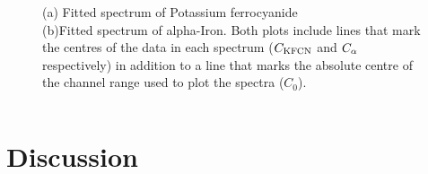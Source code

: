 \documentclass[a4paper, twocolumn]{article}
\begin{document}
\begin{figure}[!htbp]
\centering
{}
\caption{(a) Fitted spectrum of Potassium ferrocyanide\\ 
(b)Fitted spectrum of alpha-Iron. Both plots include lines that mark the centres of the data in each spectrum ($C_{\rm KFCN}$ and $C_{\rm \alpha}$ respectively) in addition to a line that marks the absolute centre of the channel range used to plot the spectra ($C_0$).
}
\end{figure}

\begin{equation} 
\end{equation}

\clearpage
\twocolumn

\section{Discussion}
\end{document}
